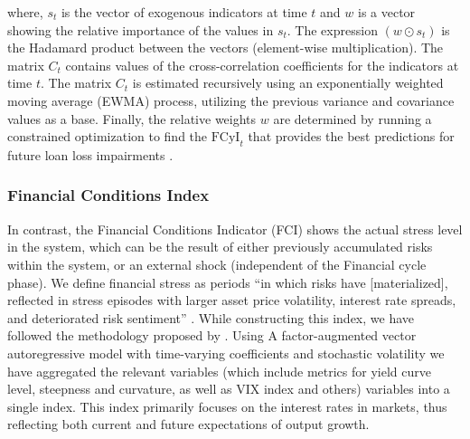 \documentclass[12pt,a4paper]{article}
\begin{document}
where, $s_t$ is the vector of exogenous indicators at time $t$ and $w$ is a vector showing the relative importance of the values in $s_t$. The expression $(w\odot s_t)$ is the Hadamard product between the vectors (element-wise multiplication). The matrix $C_t$ contains values of the cross-correlation coefficients for the indicators at time $t$. The matrix $C_t$ is estimated recursively using an exponentially weighted moving average (EWMA) process, utilizing the previous variance and covariance values as a base. Finally, the relative weights $w$ are determined by running a constrained optimization to find the $\text{FCyI}_t$ that provides the best predictions for future loan loss impairments \citep{plasil2014}.

\subsubsection{Financial Conditions Index}
In contrast, the Financial Conditions Indicator (FCI) shows the actual stress level in the system, which can be the result of either previously accumulated risks within the system, or an external shock (independent of the Financial cycle phase). We define financial stress as periods ``in which risks have [materialized], reflected in stress episodes with larger asset price volatility, interest rate spreads, and deteriorated risk sentiment'' \citep{esrb2021}. While constructing this index, we have followed the methodology proposed by \citet{koop_2013}. Using A factor-augmented vector autoregressive model with time-varying coefficients and stochastic volatility we have aggregated the relevant variables (which include metrics for yield curve level, steepness and curvature, as well as VIX index and others) variables into a single index. This index primarily focuses on the interest rates in markets, thus reflecting both current and future expectations of output growth.
\end{document}
